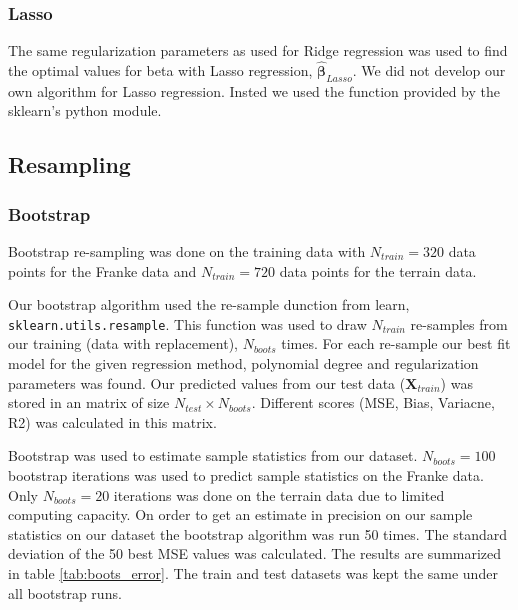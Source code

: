 \subsubsection{Lasso}
The same regularization parameters as used for Ridge regression was used to find the
optimal values for beta with Lasso regression, $\hat{\bm{\beta } } _{Lasso} $. We did not develop our
own algorithm for Lasso regression. Insted we used the function provided by the
sklearn's python module.  

\subsection{Resampling}

\subsubsection{Bootstrap}
Bootstrap re-sampling was done on the training data with $N_{train } = 320$
data points for the Franke data and $N_{train } = 720$ data points for the
terrain data.

Our bootstrap algorithm used the re-sample dunction from learn,
\verb|sklearn.utils.resample|. This function was used to draw $N_{train } $
re-samples from our training (data with replacement), $N_{boots} $ times. For
each re-sample our best fit model for the given regression method, polynomial
degree and regularization parameters was found. Our predicted values from our
test data ($\bm{X} _{train} $) was stored in an matrix of size $N_{test} \times
N_{boots} $. Different scores (MSE, Bias, Variacne, R2) was calculated in this
matrix. 

Bootstrap was used to estimate sample statistics from our dataset. $N_{boots} =
100$ bootstrap iterations was used to predict sample statistics on the Franke
data. Only $N_{boots} = 20 $ iterations was done on the terrain data due to
limited computing capacity. On order to get an estimate in precision on our
sample statistics on our dataset the bootstrap algorithm was run 50 times. The
standard deviation of the 50 best MSE values was calculated. The results are
summarized in table \ref{tab:boots_error}. The train and test datasets was kept
the same under all bootstrap runs. 

